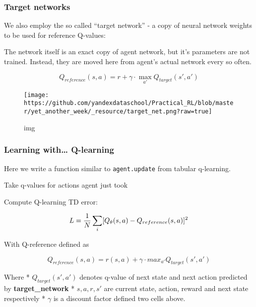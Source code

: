 \documentclass[11pt]{article}
\makeatletter
\def\maxwidth{\ifdim\Gin@nat@width>\linewidth\linewidth
    \else\Gin@nat@width\fi}
\let\Oldincludegraphics\includegraphics
\renewcommand{\includegraphics}[1]{\Oldincludegraphics[width=.8\maxwidth]{#1}}
\makeatother
\begin{document}
    \hypertarget{target-networks}{%
\subsubsection{Target networks}\label{target-networks}}

We also employ the so called ``target network'' - a copy of neural
network weights to be used for reference Q-values:

The network itself is an exact copy of agent network, but it's
parameters are not trained. Instead, they are moved here from agent's
actual network every so often.

\[ Q_{reference}(s,a) = r + \gamma \cdot \max _{a'} Q_{target}(s',a') \]

\begin{figure}
\centering
\texttt{[image: https://github.com/yandexdataschool/Practical\_RL/blob/master/yet\_another\_week/\_resource/target\_net.png?raw=true]}
\caption{img}
\end{figure}

    \hypertarget{learning-with-q-learning}{%
\subsubsection{Learning with\ldots{}
Q-learning}\label{learning-with-q-learning}}

Here we write a function similar to \texttt{agent.update} from tabular
q-learning.

    Take q-values for actions agent just took

    Compute Q-learning TD error:

\[ L = { 1 \over N} \sum_i [ Q_{\theta}(s,a) - Q_{reference}(s,a) ] ^2 \]

With Q-reference defined as

\[ Q_{reference}(s,a) = r(s,a) + \gamma \cdot max_{a'} Q_{target}(s', a') \]

Where * \(Q_{target}(s',a')\) denotes q-value of next state and next
action predicted by \textbf{target\_network} * \(s, a, r, s'\) are
current state, action, reward and next state respectively * \(\gamma\)
is a discount factor defined two cells above.
\end{document}
